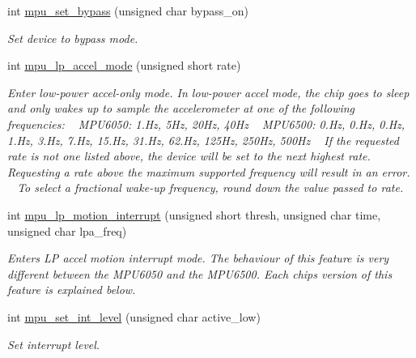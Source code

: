 \begin{DoxyCompactItemize}
\item 
int \hyperlink{group___d_r_i_v_e_r_s_ga36f70f38371b48d81094d3b061233e15}{mpu\+\_\+set\+\_\+bypass} (unsigned char bypass\+\_\+on)
\begin{DoxyCompactList}\small\item\em Set device to bypass mode. \end{DoxyCompactList}\item 
int \hyperlink{group___d_r_i_v_e_r_s_gabdcf10922a1a20f1b5bbd7576d3189b9}{mpu\+\_\+lp\+\_\+accel\+\_\+mode} (unsigned short rate)
\begin{DoxyCompactList}\small\item\em Enter low-\/power accel-\/only mode. In low-\/power accel mode, the chip goes to sleep and only wakes up to sample the accelerometer at one of the following frequencies\+: ~\newline
 M\+P\+U6050\+: 1.\+Hz, 5\+Hz, 20\+Hz, 40\+Hz ~\newline
 M\+P\+U6500\+: 0.\+Hz, 0.\+Hz, 0.\+Hz, 1.\+Hz, 3.\+Hz, 7.\+Hz, 15.\+Hz, 31.\+Hz, 62.\+Hz, 125\+Hz, 250\+Hz, 500\+Hz ~\newline
 If the requested rate is not one listed above, the device will be set to the next highest rate. Requesting a rate above the maximum supported frequency will result in an error. ~\newline
 To select a fractional wake-\/up frequency, round down the value passed to {\itshape rate}. \end{DoxyCompactList}\item 
int \hyperlink{group___d_r_i_v_e_r_s_ga7d0b3259346898ccd1ba6ef78bf7df97}{mpu\+\_\+lp\+\_\+motion\+\_\+interrupt} (unsigned short thresh, unsigned char time, unsigned char lpa\+\_\+freq)
\begin{DoxyCompactList}\small\item\em Enters LP accel motion interrupt mode. The behaviour of this feature is very different between the M\+P\+U6050 and the M\+P\+U6500. Each chip\textquotesingle{}s version of this feature is explained below. \end{DoxyCompactList}\item 
int \hyperlink{group___d_r_i_v_e_r_s_gacc92fb1489ef32a04bcb6b0ebde4d657}{mpu\+\_\+set\+\_\+int\+\_\+level} (unsigned char active\+\_\+low)
\begin{DoxyCompactList}\small\item\em Set interrupt level. \end{DoxyCompactList}\item 

\end{DoxyCompactItemize}
